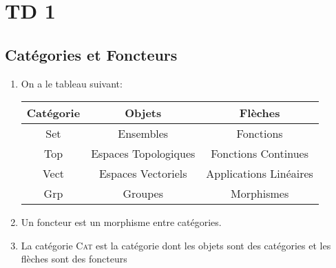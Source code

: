 \documentclass[math, info]{cours}
\begin{document}
\begin{thm}
\end{thm}

\section{TD 1}
\subsection{Catégories et Foncteurs}
\begin{enumerate}
	\item On a le tableau suivant:
	      \begin{tabular}{>{\sc}ccc}
		      \bf Catégorie & \bf Objets           & \bf Flèches            \\
		      \midrule
		      Set           & Ensembles            & Fonctions              \\
		      Top           & Espaces Topologiques & Fonctions Continues    \\
		      Vect          & Espaces Vectoriels   & Applications Linéaires \\
		      Grp           & Groupes              & Morphismes
	      \end{tabular}
	\item Un foncteur est un morphisme entre catégories.
	\item La catégorie \textsc{Cat} est la catégorie dont les objets sont des catégories et les flèches sont des foncteurs
\end{enumerate}
\end{document}
